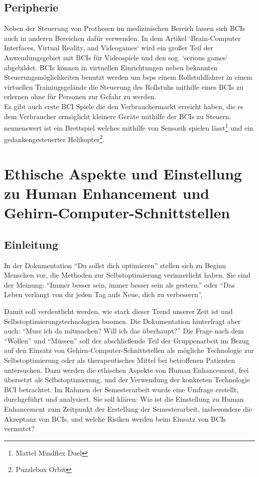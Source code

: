 \documentclass[11pt,ngerman,parskip=half]{scrartcl}
\begin{document}
\subsection{Peripherie}
Neben der Steuerung von Prothesen im medizinischen Bereich lassen sich BCIs
auch in anderen Bereichen dafür verwenden. In dem Artikel `Brain-Computer
Interfaces, Virtual Reality, and Videogames`\parencite{vidya} wird ein großer
Teil der Anwendungsgebiet mit BCIs für Videospiele und den sog. `serious
games` abgebildet. BCIs können in virtuellen Einrichtungen neben bekannten
Steuerungsmöglichkeiten benutzt werden um bsps einem Rollstuhlfahrer in einem
virtuellen Trainingsgelände die Steuerung des Rollstuhs mithilfe eines BCIs
zu erlernen ohne für Personen zur Gefahr zu werden\parencite[S.3
ff.]{vidya}.\\ Es gibt auch erste BCI Spiele die den Verbrauchermarkt
erreicht haben, die es dem Verbraucher ermöglicht kleinere Geräte mithilfe
der BCIs zu Steuern, nennenswert ist ein Brettspiel welches mithilfe von
Sensorik spielen lässt\footnote{Mattel Mindflex Duel} und ein
gedankengesteuerter Helikopter\footnote{Puzzlebox Orbit}.

\pagebreak
\section{Ethische Aspekte und Einstellung zu Human Enhancement und Gehirn-Computer-Schnittstellen}
\label{sec:kathrin}
\subsection{Einleitung}
\label{subsec:kathrin_einleitung}
In der Dokumentation \enquote{Du sollst dich optimieren} stellen sich zu
Beginn Menschen vor, die Methoden zur Selbstoptimierung verinnerlicht haben.
Sie sind der Meinung: \enquote{Immer besser sein, immer besser sein als
gestern.} oder \enquote{Das Leben verlangt von dir jeden Tag aufs Neue, dich
zu verbessern}. \parencite[][Min. 0--1]{dettmer-finke_du_2017}

Damit soll verdeutlicht werden, wie stark dieser Trend unserer Zeit ist und
Selbstoptimierungstechnologien boomen.
\parencite[vgl.][]{defi-filmproduktion_text_2018} Die Dokumentation
hinterfragt aber auch: \enquote{Muss ich da mitmachen? Will ich das
überhaupt?} \parencite[][Min. 1--2]{dettmer-finke_du_2017} Die Frage nach dem
\enquote{Wollen} und \enquote{Müssen} soll der abschließende Teil der
Gruppenarbeit im Bezug auf den Einsatz von Gehirn-Computer-Schnittstellen als
mögliche Technologie zur Selbstoptimierung oder als therapeutisches Mittel
bei betroffenen Patienten untersuchen. Dazu werden die ethischen Aspekte von
Human Enhancement, frei übersetzt als Selbstoptimierung, und der Verwendung
der konkreten Technologie BCI betrachtet. Im Rahmen der Semesterarbeit wurde
eine Umfrage erstellt, durchgeführt und analysiert. Sie soll klären: Wie ist
die Einstellung zu Human Enhancement zum Zeitpunkt der Erstellung der
Semesterarbeit, insbesondere die Akzeptanz von BCIs, und welche Risiken
werden beim Einsatz von BCIs vermutet?
\end{document}
